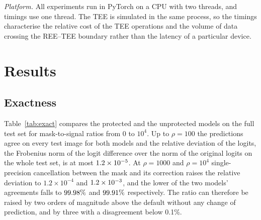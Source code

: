 \documentclass[lettersize,journal]{IEEEtran}
\begin{document}
\emph{Platform.} All experiments run in PyTorch on a CPU with two threads, and timings use one thread. The TEE is simulated in the same process, so the timings characterise the relative cost of the TEE operations and the volume of data crossing the REE--TEE boundary rather than the latency of a particular device.

\section{Results}
\label{sec:results}

\subsection{Exactness}
Table~\ref{tab:exact} compares the protected and the unprotected models on the full test set for mask-to-signal ratios from 0 to $10^4$. Up to $\rho=100$ the predictions agree on every test image for both models and the relative deviation of the logits, the Frobenius norm of the logit difference over the norm of the original logits on the whole test set, is at most $1.2\times10^{-5}$. At $\rho=1000$ and $\rho=10^{4}$ single-precision cancellation between the mask and its correction raises the relative deviation to $1.2\times10^{-4}$ and $1.2\times10^{-3}$, and the lower of the two models' agreements falls to $99.98\%$ and $99.91\%$ respectively. The ratio can therefore be raised by two orders of magnitude above the default without any change of prediction, and by three with a disagreement below 0.1\%.

\begin{table}[!t]
\centering
\caption{Exactness of the protected models}
\label{tab:exact}

\end{table}
\end{document}
